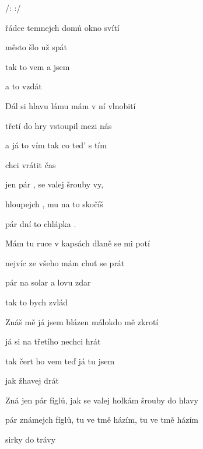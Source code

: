 

/:     :/    

\zs
{} řádce temnejch domů  okno svítí

 město šlo už  spát

tak  to vem a  jsem

a  to vzdát
\ks

\zs
Dál si hlavu lámu mám v ní vlnobití

třetí do hry vstoupil mezi nás

a já to vím tak co ted’ s tím

chci vrátit čas
\ks

\zr
{} jen pár ,
 se valej  šrouby vy,

 hloupejch ,
 mu na to skočíš

 pár dní to chlápka .
\kr

\zs
Mám tu ruce v kapsách dlaně se mi potí

nejvíc ze všeho mám chuť se prát

pár na solar a lovu zdar

tak to bych zvlád
\ks

\zs
Znáš mě já jsem blázen málokdo mě zkrotí

já si na třetího nechci hrát

tak čert ho vem teď já tu jsem

jak žhavej drát
\ks

\zr  \kr

\zr
Zná jen pár fíglů,
jak se valej holkám šrouby do hlavy

pár známejch fíglů,
 tu ve tmě házím,
 tu ve tmě házím

 sirky do trávy
\kr

\kp






















